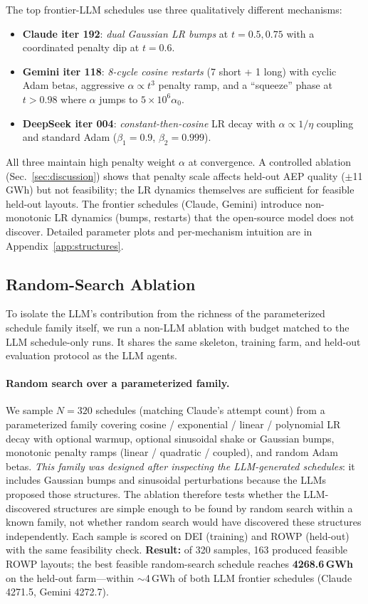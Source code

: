 The top frontier-LLM schedules use three qualitatively different
mechanisms:
\begin{itemize}[nosep]
\item \textbf{Claude iter 192}: \emph{dual Gaussian LR bumps} at
  $t=0.5, 0.75$ with a coordinated penalty dip at $t=0.6$.
\item \textbf{Gemini iter 118}: \emph{8-cycle cosine restarts}
  (7 short + 1 long) with cyclic Adam betas, aggressive $\alpha
  \propto t^3$ penalty ramp, and a ``squeeze'' phase at $t>0.98$
  where $\alpha$ jumps to $5\!\times\!10^6 \alpha_0$.
\item \textbf{DeepSeek iter 004}: \emph{constant-then-cosine}
  LR decay with $\alpha \propto 1/\eta$ coupling and standard
  Adam ($\beta_1\!=\!0.9$, $\beta_2\!=\!0.999$).
\end{itemize}
All three maintain high penalty weight $\alpha$ at convergence.
A controlled ablation (Sec.~\ref{sec:discussion}) shows that
penalty scale affects held-out AEP quality ($\pm$11\,GWh) but
not feasibility; the LR dynamics themselves are sufficient for
feasible held-out layouts.  The frontier schedules (Claude, Gemini)
introduce non-monotonic LR dynamics (bumps, restarts) that the
open-source model does not discover.
Detailed parameter plots and per-mechanism intuition are in
Appendix~\ref{app:structures}.

\subsection{Random-Search Ablation}
\label{sec:ablations}

To isolate the LLM's contribution from the richness of the
parameterized schedule family itself, we run a non-LLM ablation
with budget matched to the LLM schedule-only runs. It shares the
same skeleton, training farm, and held-out evaluation protocol as
the LLM agents.

\paragraph{Random search over a parameterized family.}
We sample $N=320$ schedules (matching Claude's attempt count) from
a parameterized family covering cosine / exponential / linear /
polynomial LR decay with optional warmup, optional sinusoidal shake
or Gaussian bumps, monotonic penalty ramps (linear / quadratic /
coupled), and random Adam betas. \emph{This family was designed
after inspecting the LLM-generated schedules}: it includes Gaussian
bumps and sinusoidal perturbations because the LLMs proposed those
structures. The ablation therefore tests whether the
LLM-discovered structures are simple enough to be found by random
search within a known family, not whether random search would have
discovered these structures independently.
Each sample is scored on DEI
(training) and ROWP (held-out) with the same feasibility check.
\textbf{Result:} of 320 samples, 163 produced feasible ROWP layouts;
the best feasible random-search schedule reaches \textbf{4268.6\,GWh}
on the held-out farm---within $\sim$4\,GWh of both LLM frontier
schedules (Claude 4271.5, Gemini 4272.7).

